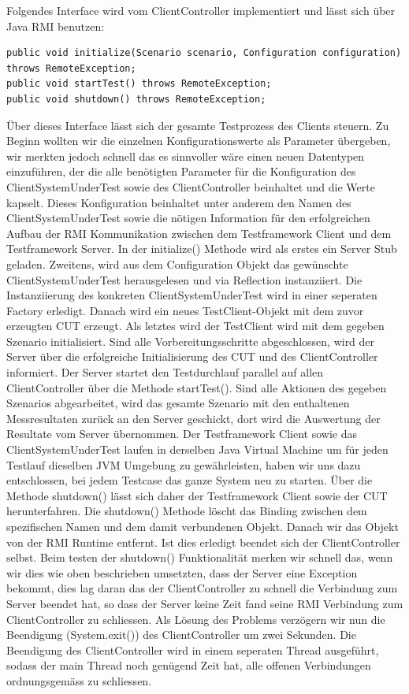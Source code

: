 Folgendes Interface wird vom ClientController implementiert und lässt sich über Java RMI benutzen:
\begin{lstlisting}	
public void initialize(Scenario scenario, Configuration configuration) throws RemoteException;
public void startTest() throws RemoteException;
public void shutdown() throws RemoteException;
\end{lstlisting}
Über dieses Interface lässt sich der gesamte Testprozess des Clients steuern. Zu Beginn wollten wir die einzelnen Konfigurationswerte als Parameter übergeben, wir merkten jedoch schnell das es sinnvoller wäre einen neuen Datentypen einzuführen, der die alle benötigten Parameter für die Konfiguration des ClientSystemUnderTest sowie des ClientController beinhaltet und die Werte kapselt. Dieses Konfiguration beinhaltet unter anderem den Namen des ClientSystemUnderTest sowie die nötigen Information für den erfolgreichen Aufbau der RMI Kommunikation zwischen dem Testframework Client und dem Testframework Server. In der initialize() Methode wird als erstes ein Server Stub geladen. Zweitens, wird aus dem Configuration Objekt das gewünschte ClientSystemUnderTest herausgelesen und via Reflection instanziiert. Die Instanziierung des konkreten ClientSystemUnderTest wird in einer seperaten Factory erledigt. Danach wird ein neues TestClient-Objekt mit dem zuvor erzeugten CUT erzeugt. Als letztes wird der TestClient wird mit dem gegeben Szenario initialisiert. Sind alle Vorbereitungsschritte abgeschlossen, wird der Server über die erfolgreiche Initialisierung des CUT und des ClientController informiert. Der Server startet den Testdurchlauf parallel auf allen ClientController über die Methode startTest(). Sind alle Aktionen des gegeben Szenarios abgearbeitet, wird das gesamte Szenario mit den enthaltenen Messresultaten zurück an den Server geschickt, dort wird die Auswertung der Resultate vom Server übernommen. Der Testframework Client sowie das ClientSystemUnderTest laufen in derselben Java Virtual Machine um für jeden Testlauf dieselben JVM Umgebung zu gewährleisten, haben wir uns dazu entschlossen, bei jedem Testcase das ganze System neu zu starten. Über die Methode shutdown() lässt sich daher der Testframework Client sowie der CUT herunterfahren. Die shutdown() Methode löscht das Binding zwischen dem spezifischen Namen und dem damit verbundenen Objekt. Danach wir das Objekt von der RMI Runtime entfernt. Ist dies erledigt beendet sich der ClientController selbst. Beim testen der shutdown() Funktionalität merken wir schnell das, wenn wir dies wie oben beschrieben umsetzten, dass der Server eine Exception bekommt, dies lag daran das der ClientController zu schnell die Verbindung zum Server beendet hat, so dass der Server keine Zeit fand seine RMI Verbindung zum ClientController zu schliessen. Als Lösung des Problems verzögern wir nun die Beendigung (System.exit()) des ClientController um zwei Sekunden. Die Beendigung des ClientController wird in einem seperaten Thread ausgeführt, sodass der main Thread noch genügend Zeit hat, alle offenen Verbindungen ordnungsgemäss zu schliessen.    

